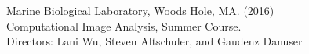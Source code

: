 Marine Biological Laboratory, Woods Hole, MA. (2016)\\
Computational Image Analysis, Summer Course. \\
Directors: Lani Wu, Steven Altschuler, and Gaudenz Danuser